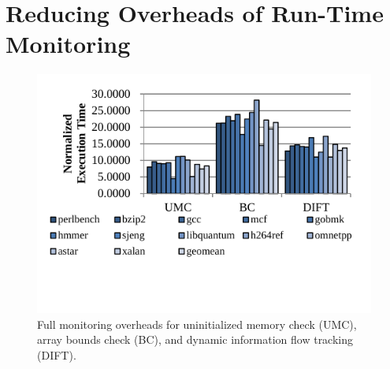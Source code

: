 \section{Reducing Overheads of Run-Time Monitoring}
\label{sec:optimizations}

\begin{figure}
  \begin{center}
    \includegraphics[width=\columnwidth]{figs/data_full_mon.pdf}
    \vspace{-0.2in}
    \caption{Full monitoring overheads for uninitialized memory check (UMC), array bounds check (BC), and dynamic information flow tracking (DIFT).}
    \label{fig:optimizations.full_mon}
    \vspace{-0.1in}
  \end{center}
\end{figure}

